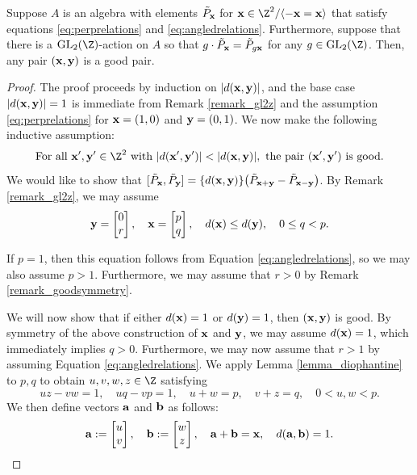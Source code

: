 \begin{proposition}\label{lemma_allfromsome}
Suppose $A$ is an algebra with elements $\tilde{P}_{\mathbf{x}}$ for $\xx \in \Z^2/\langle -\xx = \xx \rangle$ that satisfy equations \eqref{eq:perprelations} and \eqref{eq:angledrelations}. Furthermore, suppose that there is a $\GL_2(\Z)$-action on $A$ so that $g \cdot \tilde{P}_{\mathbf{x}} = \tilde{P}_{g {\mathbf{x}}}$ for any $g \in \GL_2(\Z)$. Then, any pair $({\mathbf{x}}, {\mathbf{y}})$ is a good pair. 
\end{proposition}
\begin{proof}
	The proof proceeds by induction on $\lvert d({\mathbf{x}},{\mathbf{y}})\rvert $, and the base case $\lvert d({\mathbf{x}},{\mathbf{y}})\rvert = 1$ is immediate from Remark \ref{remark_gl2z} and the assumption \eqref{eq:perprelations} for ${\mathbf{x}} = (1,0)$ and ${\mathbf{y}} = (0,1)$. We now make the following inductive assumption:
	\begin{equation}\label{assumption1} 
	\textrm{For all } \xx',\yy' \in \Z^2\textrm{ with } \lvert d(\xx',\yy')\rvert < \lvert d(\xx,\yy) \rvert, \textrm{ the pair } (\xx',\yy') \textrm{ is good.}
	\end{equation}
	We would like to show that $[\tilde{P}_{{\mathbf{x}}},\tilde{P}_{{\mathbf{y}}}] = \{d({\mathbf{x}},{\mathbf{y}})\} \big( \tilde{P}_{{\mathbf{x}} + {\mathbf{y}}} - \tilde{P}_{{\mathbf{x}}-{\mathbf{y}}} \big)$. By Remark \ref{remark_gl2z}, we may assume
	\[
	{\mathbf{y}} = \begin{bmatrix}0\\r\end{bmatrix},\quad {\mathbf{x}} = \begin{bmatrix}p\\q\end{bmatrix},\quad d({\mathbf{x}}) \leq d({\mathbf{y}}),\quad 0 \leq q < p.
	\]
	
	If $p=1$, then this equation follows from Equation \eqref{eq:angledrelations}, so we may also assume $p > 1$. Furthermore, we may assume that $r>0$ by Remark \ref{remark_goodsymmetry}. 

	We will now show that if either $d({\mathbf{x}})=1$ or $d({\mathbf{y}})=1$, then $({\mathbf{x}},{\mathbf{y}})$ is good. By symmetry of the above construction of ${\mathbf{x}}$ and ${\mathbf{y}}$, we may assume $d({\mathbf{x}})=1$, which immediately implies $q>0$. Furthermore, we may now assume that $r>1$ by assuming Equation \eqref{eq:angledrelations}. We apply Lemma \ref{lemma_diophantine} to $p, q$ to obtain  $u,v,w,z \in \Z$ satisfying 
	\begin{equation}\label{assumption1.49}
	uz - vw = 1,\quad uq - vp = 1,\quad u + w = p,\quad v + z = q,\quad 0 < u,w < p.
	\end{equation}
	We then define vectors ${\mathbf{a}}$ and ${\mathbf{b}}$ as follows:
	\begin{equation}\label{assumption1.9}
	\aab := \begin{bmatrix}  u\\ v\end{bmatrix},\quad 
	\bb := \begin{bmatrix} w\\ z\end{bmatrix},
	\quad \aab + \bb = \xx,\quad d(\aab, \bb) = 1. %
	\end{equation}


\end{proof}
